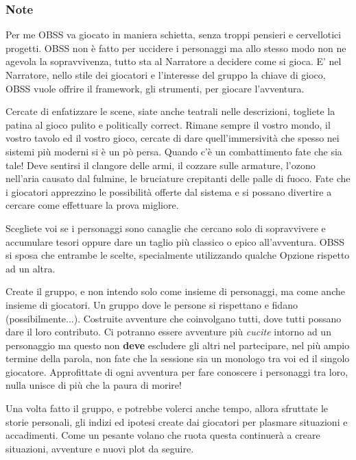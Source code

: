 \vfill


\begin{multicols}{2}

\subsubsection*{Note}

{\small

Per me OBSS va giocato in maniera schietta, senza troppi pensieri e cervellotici progetti. OBSS non è fatto per uccidere i personaggi ma allo stesso modo non ne agevola la sopravvivenza, tutto sta al Narratore a decidere come si gioca. E' nel Narratore, nello stile dei giocatori e l'interesse del gruppo la chiave di gioco, OBSS vuole offrire il framework, gli strumenti, per giocare l'avventura.

Cercate di enfatizzare le scene, siate anche teatrali nelle descrizioni, togliete la patina al gioco pulito e politically correct. Rimane sempre il vostro mondo, il vostro tavolo ed il vostro gioco, cercate di dare quell'immersività che spesso nei sistemi più moderni si è un pò persa.
Quando c'è un combattimento fate che sia tale! Deve sentirsi il clangore delle armi, il cozzare sulle armature, l'ozono nell'aria causato dal fulmine, le bruciature crepitanti delle palle di fuoco. Fate che i giocatori apprezzino le possibilità offerte dal sistema e si possano divertire a cercare come effettuare la prova migliore.

Scegliete voi se i personaggi sono canaglie che cercano solo di sopravvivere e accumulare tesori oppure dare un taglio più classico o epico all'avventura. OBSS si sposa che entrambe le scelte, specialmente utilizzando qualche Opzione rispetto ad un altra.

Create il gruppo, e non intendo solo come insieme di personaggi, ma come anche insieme di giocatori. Un gruppo dove le persone si rispettano e fidano (possibilmente...). Costruite avventure che coinvolgano tutti, dove tutti possano dare il loro contributo. Ci potranno essere avventure più \emph{cucite} intorno ad un personaggio ma questo non \textbf{deve} escludere gli altri nel partecipare, nel più ampio termine della parola, non fate che la sessione sia un monologo tra voi ed il singolo giocatore.
Approfittate di ogni avventura per fare conoscere i personaggi tra loro, nulla unisce di più che la paura di morire!

Una volta fatto il gruppo, e potrebbe volerci anche tempo, allora sfruttate le storie personali, gli indizi ed ipotesi create dai giocatori per plasmare situazioni e accadimenti. Come un pesante volano che ruota questa continuerà a creare situazioni, avventure e nuovi plot da seguire.

}
\end{multicols}
